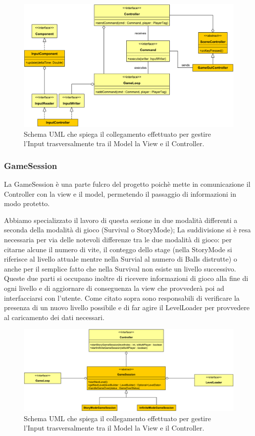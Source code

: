 \documentclass[a4paper,12pt]{report}
\begin{document}
\begin{figure}[H]
\includegraphics[width=\linewidth]{img/input}
\caption{Schema UML che spiega il collegamento effettuato per gestire l'Input trasversalmente tra il Model la View e il Controller.}
\label{img:input}
\end{figure}

\subsubsection*{GameSession}

La GameSession è una parte fulcro del progetto poichè mette in comunicazione il Controller con la view e il model, permetendo il passaggio di informazioni in modo protetto.

Abbiamo specializzato il lavoro di questa sezione in due modalità differenti a seconda della modalità di gioco (Survival o StoryMode); 
La suddivisione si è resa necessaria per via delle notevoli differenze tra le due modalità di gioco: per citarne alcune il numero di vite, il conteggo dello stage (nella StoryMode si riferisce al livello attuale mentre nella Survial al numero di Balls distrutte) o anche per il semplice fatto che nella Survival non esiste un livello successivo.
Queste due parti si occupano inoltre di ricevere informazioni di gioco alla fine di ogni livello e di aggiornare di conseguenza la view che provvederà poi ad interfacciarsi con l'utente.
Come citato sopra sono responsabili di verificare la presenza di un nuovo livello possibile e di far agire il LevelLoader per provvedere al caricamento dei dati necessari.

\begin{figure}[H]
\includegraphics[width=\linewidth]{img/gamesession}
\caption{Schema UML che spiega il collegamento effettuato per gestire l'Input trasversalmente tra il Model la View e il Controller.}
\label{img:gamesession}
\end{figure}
\end{document}
